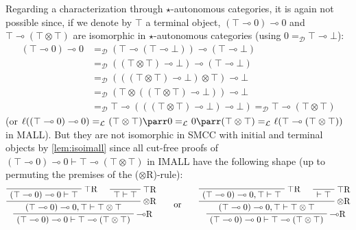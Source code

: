 \documentclass{lmcs}
\newcommand*{\tens}{\otimes} %
\newcommand*{\lolipop}{\multimap} %
\newcommand*{\Eu}{\mathcal{L}} %
\newcommand*{\eqeq}{=} %
\newcommand*{\eqEu}[1][]{\eqeq_{\Eu_{#1}}} %
\newcommand*{\isom}{\eqEu} %
\newcommand*{\thD}{\mathcal{D}}
\newcommand*{\isoc}{\eqeq_\thD} %
\newcommand*{\tradm}[1]{\ell(#1)}
\begin{document}
Regarding a characterization through $\star$-autonomous categories, it is again not possible since, if we denote by $\top$ a terminal object, $(\top\lolipop 0)\lolipop 0$
and $\top\lolipop(\top\tens\top)$
are isomorphic in $\star$-autonomous categories (using $0\isoc\top\lolipop\bot$):
\begin{align*}
  (\top\lolipop 0)\lolipop 0 &\isoc (\top\lolipop(\top\lolipop\bot))\lolipop(\top\lolipop\bot) \\
  &\isoc ((\top\tens\top)\lolipop\bot)\lolipop(\top\lolipop\bot) \\
  &\isoc (((\top\tens\top)\lolipop\bot)\tens\top)\lolipop\bot \\
  &\isoc (\top\tens((\top\tens\top)\lolipop\bot))\lolipop\bot \\
  &\isoc \top\lolipop(((\top\tens\top)\lolipop\bot)\lolipop\bot) \isoc \top\lolipop(\top\tens\top)
\end{align*}
(or $\tradm{(\top\lolipop 0)\lolipop 0} \isom (\top\tens\top)\parr 0 \isom 0\parr(\top\tens\top) \isom \tradm{\top\lolipop(\top\tens\top)}$ in MALL).
But they are not isomorphic in SMCC with initial and terminal objects by \autoref{lem:isoimall} since all cut-free proofs of $(\top\lolipop 0)\lolipop 0\vdash \top\lolipop(\top\tens\top)$ in IMALL have the following shape (up to permuting the premises of the ($\tens$R)-rule):
\begin{equation*}
  \AxiomC{}
  \RightLabel{$\top$R}
  \UnaryInfC{$(\top\lolipop 0)\lolipop 0\vdash \top$}
  \AxiomC{}
  \RightLabel{$\top$R}
  \UnaryInfC{$\top\vdash \top$}
  \RightLabel{$\tens$R}
  \BinaryInfC{$(\top\lolipop 0)\lolipop 0, \top\vdash \top\tens\top$}
  \RightLabel{$\lolipop$R}
  \UnaryInfC{$(\top\lolipop 0)\lolipop 0\vdash \top\lolipop(\top\tens\top)$}
  \DisplayProof
\qquad\text{or}\qquad
  \AxiomC{}
  \RightLabel{$\top$R}
  \UnaryInfC{$(\top\lolipop 0)\lolipop 0, \top\vdash \top$}
  \AxiomC{}
  \RightLabel{$\top$R}
  \UnaryInfC{$\vdash \top$}
  \RightLabel{$\tens$R}
  \BinaryInfC{$(\top\lolipop 0)\lolipop 0, \top\vdash \top\tens\top$}
  \RightLabel{$\lolipop$R}
  \UnaryInfC{$(\top\lolipop 0)\lolipop 0\vdash \top\lolipop(\top\tens\top)$}
  \DisplayProof
\end{equation*}
\end{document}
